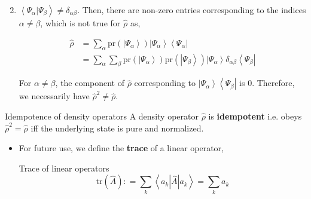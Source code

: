 \documentclass[9pt,handout]{beamer}
\newcommand{\pr}[0]{\text{pr}}
\newcommand{\tr}[0]{\text{tr}}
\begin{document}
\begin{frame}{}
\begin{enumerate}
\setcounter{enumi}{1}
\item $\left\langle \Psi_\alpha \right\rvert \left. \Psi_\beta \right\rangle \neq \delta_{\alpha \beta}$. Then, there are non-zero entries corresponding to the indices $\alpha \neq \beta$, which is not true for $\widehat{\rho}$ as,

\begin{align*}
\widehat{\rho} & = \sum_{\alpha} \pr \left( \left\lvert \Psi_\alpha \right\rangle \right) \left\lvert \Psi_\alpha \right\rangle \left\langle \Psi_\alpha \right\rvert \\
& = \sum_\alpha \sum_\beta \pr \left( \left\lvert \Psi_\alpha \right\rangle \right) \pr \left( \left\lvert \Psi_\beta \right\rangle \right) \left\lvert \Psi_\alpha \right\rangle \delta_{\alpha \beta} \left\langle \Psi_\beta \right\rvert
\end{align*}

For $\alpha \neq \beta$, the component of $\widehat{\rho}$ corresponding to $\left\lvert \Psi_\alpha \right\rangle \left\langle \Psi_\beta \right\rvert$ is $0$. Therefore, we necessarily have $\widehat{\rho}^2 \neq \widehat{\rho}$.
\end{enumerate}

\begin{block}{Idempotence of density operators}
A density operator $\widehat{\rho}$ is \textbf{idempotent} i.e. obeys $\widehat{\rho}^2 = \widehat{\rho}$ iff the underlying state is pure and normalized.
\end{block}

\begin{itemize}
\item For future use, we define the \textbf{trace} of a linear operator,

\begin{block}{Trace of linear operators}
$$\tr \left( \widehat{A} \right) : = \sum_k \left\langle a_k \left\lvert \widehat{A} \right\rvert a_k \right\rangle = \sum_k a_k$$
\end{block}
\end{itemize}
\end{frame}
\end{document}
